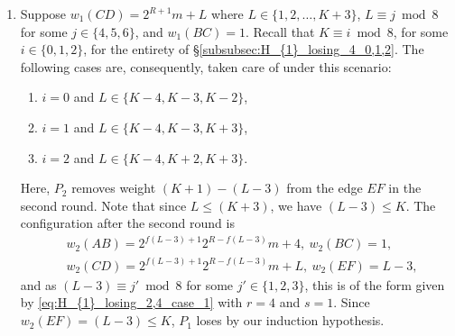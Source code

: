 \documentclass[11pt,reqno]{amsart}
\theoremstyle{definition}
\theoremstyle{definition}
\begin{document}
\begin{enumerate}
\begin{enumerate}
\item Suppose $w_{1}(CD)=2^{R+1}m+L$ where $L \in \{1,2,\ldots,K+3\}$, $L \equiv j \bmod 8$ for some $j \in \{4,5,6\}$, and $w_{1}(BC)=1$. Recall that $K \equiv i \bmod 8$, for some $i \in \{0,1,2\}$, for the entirety of \S\ref{subsubsec:H_{1}_losing_4_0,1,2}. The following cases are, consequently, taken care of under this scenario:  
\begin{enumerate}
\item $i=0$ and $L \in \{K-4,K-3,K-2\}$, 
\item $i=1$ and $L \in \{K-4,K-3,K+3\}$,
\item $i=2$ and $L \in \{K-4,K+2,K+3\}$.
\end{enumerate} 
Here, $P_{2}$ removes weight $(K+1)-(L-3)$ from the edge $EF$ in the second round. Note that since $L \leqslant (K+3)$, we have $(L-3) \leqslant K$. The configuration after the second round is
\begin{align}
{}&w_{2}(AB)=2^{f(L-3)+1}2^{R-f(L-3)}m+4,\ w_{2}(BC)=1,\nonumber\\
{}&w_{2}(CD)=2^{f(L-3)+1}2^{R-f(L-3)}m+L,\ w_{2}(EF)=L-3,\nonumber
\end{align}
and as $(L-3) \equiv j'\bmod 8$ for some $j' \in \{1,2,3\}$, this is of the form given by \eqref{eq:H_{1}_losing_2,4_case_1} with $r=4$ and $s=1$. Since $w_{2}(EF)=(L-3)\leqslant K$, $P_{1}$ loses by our induction hypothesis.


\end{enumerate}
\end{enumerate}
\end{document}
